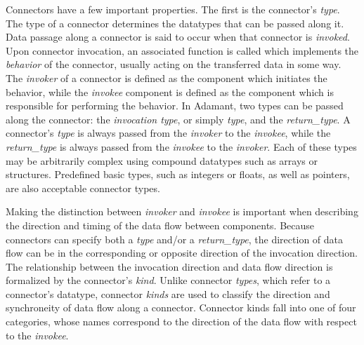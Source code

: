Connectors have a few important properties. The first is the connector's \textit{type}. The type of a connector determines the datatypes that can be passed along it. Data passage along a connector is said to occur when that connector is \textit{invoked}. Upon connector invocation, an associated function is called which implements the \textit{behavior} of the connector, usually acting on the transferred data in some way. The \textit{invoker} of a connector is defined as the component which initiates the behavior, while the \textit{invokee} component is defined as the component which is responsible for performing the behavior. In Adamant, two types can be passed along the connector: the \textit{invocation type}, or simply \textit{type}, and the \textit{return\_type}. A connector's \textit{type} is always passed from the \textit{invoker} to the \textit{invokee}, while the \textit{return\_type} is always passed from the \textit{invokee} to the \textit{invoker}.  Each of these types may be arbitrarily complex using compound datatypes such as arrays or structures. Predefined basic types, such as integers or floats, as well as pointers, are also acceptable connector types.

Making the distinction between \textit{invoker} and \textit{invokee} is important when describing the direction and timing of the data flow between components. Because connectors can specify both a \textit{type} and/or a \textit{return\_type}, the direction of data flow can be in the corresponding or opposite direction of the invocation direction. The relationship between the invocation direction and data flow direction is formalized by the connector's \textit{kind}. Unlike connector \textit{types}, which refer to a connector's datatype, connector \textit{kinds} are used to classify the direction and synchroneity of data flow along a connector. Connector kinds fall into one of four categories, whose names correspond to the direction of the data flow with respect to the \textit{invokee}. 


